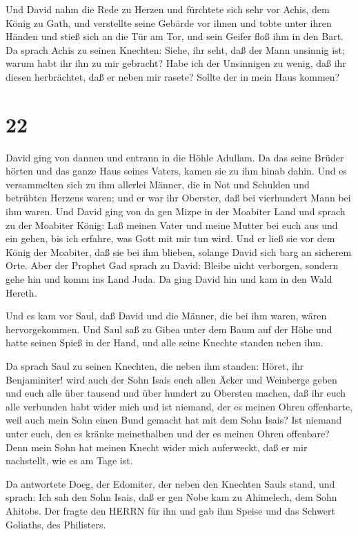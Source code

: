  Und David nahm die Rede zu Herzen und fürchtete sich sehr
vor Achis, dem König zu Gath,  und verstellte seine Gebärde
vor ihnen und tobte unter ihren Händen und stieß sich an die Tür am Tor,
und sein Geifer floß ihm in den Bart.  Da sprach Achis zu
seinen Knechten: Siehe, ihr seht, daß der Mann unsinnig ist; warum habt
ihr ihn zu mir gebracht?  Habe ich der Unsinnigen zu wenig,
daß ihr diesen herbrächtet, daß er neben mir rasete? Sollte der in mein
Haus kommen?

\hypertarget{section-21}{%
\section{22}\label{section-21}}

 David ging von dannen und entrann in die Höhle Adullam. Da
das seine Brüder hörten und das ganze Haus seines Vaters, kamen sie zu
ihm hinab dahin.  Und es versammelten sich zu ihm allerlei
Männer, die in Not und Schulden und betrübten Herzens waren; und er war
ihr Oberster, daß bei vierhundert Mann bei ihm waren.  Und
David ging von da gen Mizpe in der Moabiter Land und sprach zu der
Moabiter König: Laß meinen Vater und meine Mutter bei euch aus und ein
gehen, bis ich erfahre, was Gott mit mir tun wird.  Und er
ließ sie vor dem König der Moabiter, daß sie bei ihm blieben, solange
David sich barg an sicherem Orte.  Aber der Prophet Gad
sprach zu David: Bleibe nicht verborgen, sondern gehe hin und komm ins
Land Juda. Da ging David hin und kam in den Wald Hereth.

 Und es kam vor Saul, daß David und die Männer, die bei ihm
waren, wären hervorgekommen. Und Saul saß zu Gibea unter dem Baum auf
der Höhe und hatte seinen Spieß in der Hand, und alle seine Knechte
standen neben ihm.

 Da sprach Saul zu seinen Knechten, die neben ihm standen:
Höret, ihr Benjaminiter! wird auch der Sohn Isais euch allen Äcker und
Weinberge geben und euch alle über tausend und über hundert zu Obersten
machen,  daß ihr euch alle verbunden habt wider mich und ist
niemand, der es meinen Ohren offenbarte, weil auch mein Sohn einen Bund
gemacht hat mit dem Sohn Isais? Ist niemand unter euch, den es kränke
meinethalben und der es meinen Ohren offenbare? Denn mein Sohn hat
meinen Knecht wider mich auferweckt, daß er mir nachstellt, wie es am
Tage ist.

 Da antwortete Doeg, der Edomiter, der neben den Knechten
Sauls stand, und sprach: Ich sah den Sohn Isais, daß er gen Nobe kam zu
Ahimelech, dem Sohn Ahitobs.  Der fragte den HERRN für ihn
und gab ihm Speise und das Schwert Goliaths, des Philisters.

